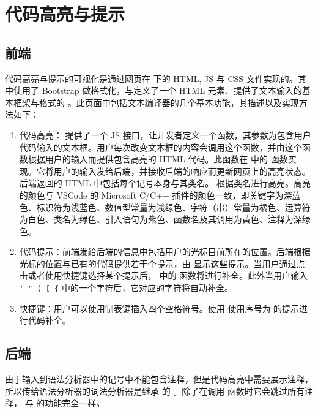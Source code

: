 \section{代码高亮与提示}

\subsection{前端}

代码高亮与提示的可视化是通过网页在  下的 HTML, JS 与 CSS 文件实现的。其中使用了 Bootstrap 做格式化，与定义了一个 HTML 元素、提供了文本输入的基本框架与格式的 \href{https://github.com/WebCoder49/code-input}{} 。此页面中包括文本编译器的几个基本功能，其描述以及实现方法如下：

\begin{enumerate}
    \item 代码高亮： 提供了一个 JS 接口，让开发者定义一个函数，其参数为包含用户代码输入的文本框。用户每次改变文本框的内容会调用这个函数，并由这个函数根据用户的输入而提供包含高亮的 HTML 代码。此函数在  中的  函数实现。它将用户的输入发给后端，并接收后端的响应而更新网页上的高亮状态。后端返回的 HTML 中包括每个记号本身与其类名。 根据类名进行高亮。高亮的颜色与 VSCode 的 Microsoft C/C++ 插件的颜色一致，即关键字为深蓝色、标识符为浅蓝色、数值型常量为浅绿色、字符（串）常量为橘色、运算符为白色、类名为绿色、引入语句为紫色、函数名及其调用为黄色、注释为深绿色。
    \item 代码提示：前端发给后端的信息中包括用户的光标目前所在的位置。后端根据光标的位置与已有的代码提供若干个提示，由  显示这些提示。当用户通过点击或者使用快捷键选择某个提示后， 中的  函数将进行补全。此外当用户输入 \lstinline`' " ( [ {` 中的一个字符后，它对应的字符将自动补全。
    \item 快捷键：用户可以使用制表键插入四个空格符号。使用  使用序号为  的提示进行代码补全。
\end{enumerate}

\subsection{后端}

由于输入到语法分析器中的记号中不能包含注释，但是代码高亮中需要展示注释，所以传给语法分析器的词法分析器是继承  的 。除了在调用  函数时它会跳过所有注释， 与  的功能完全一样。